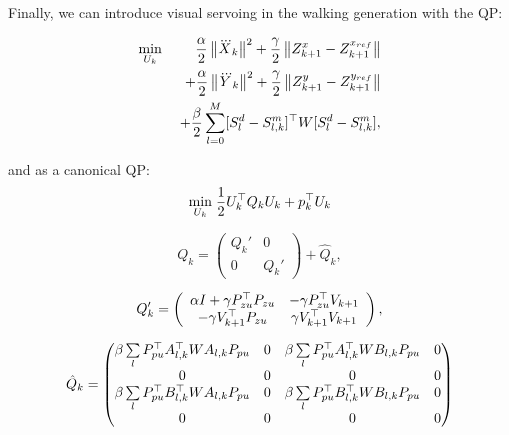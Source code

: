 Finally, we can introduce visual servoing in the walking generation with the QP:

\begin{eqnarray*}
\nonumber
 \min_{U_k} \; && \dfrac{\alpha}{2} \left\| \dddot{X}_k \right\|^2
 + \dfrac{\gamma}{2} \left\| Z_{k+1}^x - Z_{k+1}^{x_{ref}} \right\| \\
 \nonumber
 && + \dfrac{\alpha}{2} \left\| \dddot{Y}_k \right\|^2
 + \dfrac{\gamma}{2} \left\| Z_{k+1}^y - Z_{k+1}^{y_{ref}} \right\| \\
 \nonumber
 && + \dfrac{\beta}{2} \sum\limits_{l=0}^{M}  [S^d_{l}- S^m_{l,k}]^{\top} W [S^d_{l} - S^m_{l,k}],
\end{eqnarray*}

and as a canonical QP:
\begin{equation*}
\underset{U_k}{\min} \; \dfrac{1}{2} U_k^{\top} Q_k U_k + p_k^{\top} U_k
\end{equation*}

\begin{equation*}
Q_k = \left( \begin{array}{cc}
Q_k' & 0 \\
0 & Q_k'
\end{array}
 \right) + \hat{Q}_k,
\end{equation*}

\begin{equation*}
 Q_k' = \left(
 \begin{array}{cc}
 \alpha I + \gamma P^{\top}_{zu}P_{zu} & - \gamma P^{\top}_{zu}V_{k+1} \\
 -\gamma V^{\top}_{k+1} P_{zu} & \gamma V^{\top}_{k+1} V_{k+1}
 \end{array}
 \right),
\end{equation*}

\begin{equation*}
 \hat{Q}_k = \left(
 \begin{matrix}
 \beta \sum\limits_l P_{pu}^{\top} A_{l,k}^{\top} {W} A_{l,k} P_{pu} & 0 & \beta \sum\limits_l P_{pu}^{\top} A_{l,k}^{\top} {W} B_{l,k} P_{pu} & 0\\
 0 & 0 & 0 & 0 \\
 \beta \sum\limits_l P_{pu}^{\top} B_{l,k}^{\top} {W} A_{l,k} P_{pu} & 0 & \beta \sum\limits_l P_{pu}^{\top} B_{l,k}^{\top} {W} B_{l,k} P_{pu} & 0 \\
 0 & 0 & 0 & 0
 \end{matrix}
 \right)
\end{equation*}

